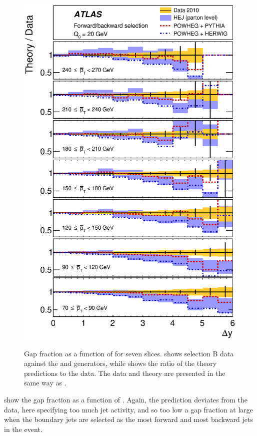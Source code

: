 \begin{figure}[htpb]
{    \includegraphics[width=\smallfigwidth]{chapters/gbj/GapFraction_YDist_gap_Q0_sel_B_Ratio.eps}
    \label{fig:gbj:Gap_fraction_dY_B_ratio}}
  \caption{Gap fraction as a function of \DeltaY for seven \pTbar slices. \protect{}
           shows selection B data against the \HEJ and \Powheg generators, while \protect{}
           shows the ratio of the theory predictions to the data. The data and theory
           are presented in the same way as .}
  \label{fig:gbj:Gap_fraction_dY_B}
\end{figure}

 show the gap
fraction as a function of \DeltaY. Again, the \HEJ prediction deviates from the
data, here specifying too much jet activity, and so too low a gap fraction at
large \DeltaY when the boundary jets are selected as the most forward and most backward jets in the event. 

